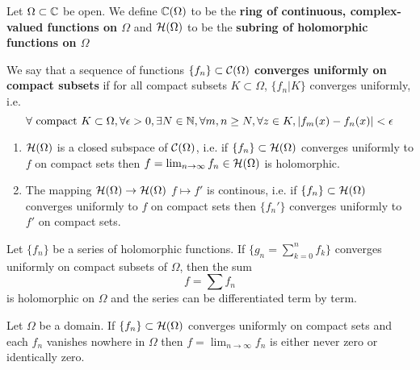 \documentclass{article}
\begin{document}
\begin{definition}
  Let \(\Omega \subset \mathbb{C}\) be open. We define \(\mathbb{C}(\Omega)\) to be the \textbf{ring of continuous, complex-valued functions on \(\Omega\)} and \(\mathcal{H}(\Omega)\) to be the \textbf{subring of holomorphic functions on \(\Omega\)}
\end{definition}

\begin{definition}
  We say that a sequence of functions \(\{f_n\} \subset \mathcal{C}(\Omega)\) \textbf{converges uniformly on compact subsets} if for all compact subsets \(K \subset \Omega\), \(\{f_n | K\}\) converges uniformly, i.e.
  \begin{equation}
    \forall \ \text{compact} \ K \subset \Omega, \forall \epsilon > 0,
      \exists N \in \mbb{N}, \forall m, n \geq N, \forall z \in K,
        |f_m(x) - f_n(x)| < \epsilon
  \end{equation}
\end{definition}

\begin{theorem}[Weierstrass]
  \begin{enumerate}
    \item \(\mathcal{H}(\Omega)\) is a closed subspace of \(\mathcal{C}(\Omega)\), i.e. if \(\{f_n\} \subset \mathcal{H}(\Omega)\) converges uniformly to \(f\) on compact sets then \(f = \lim_{n \to \infty}f_n \in \mathcal{H}(\Omega)\) is holomorphic.
    \item The mapping \(\mathcal{H}(\Omega) \to \mathcal{H}(\Omega)\) \(f \mapsto f'\) is continous, i.e. if \(\{f_n\} \subset \mathcal{H}(\Omega)\) converges uniformly to \(f\) on compact sets then \(\{f_n'\}\) converges uniformly to \(f'\) on compact sets.
  \end{enumerate}
\end{theorem}

\begin{corollary}
  Let \(\{f_n\}\) be a series of holomorphic functions. If \(\{g_n = \sum_{k = 0}^nf_k\}\) converges uniformly on compact subsets of \(\Omega\), then the sum
  \begin{equation}
    f = \sum f_n
  \end{equation}
  is holomorphic on \(\Omega\) and the series can be differentiated term by term.
\end{corollary}
\begin{proposition}
  Let \(\Omega\) be a domain. If \(\{f_n\} \subset \mathcal{H}(\Omega)\) converges uniformly on compact sets and each \(f_n\) vanishes nowhere in \(\Omega\) then \(f = \lim_{n \to \infty}f_n\) is either never zero or identically zero.
\end{proposition}
\end{document}

